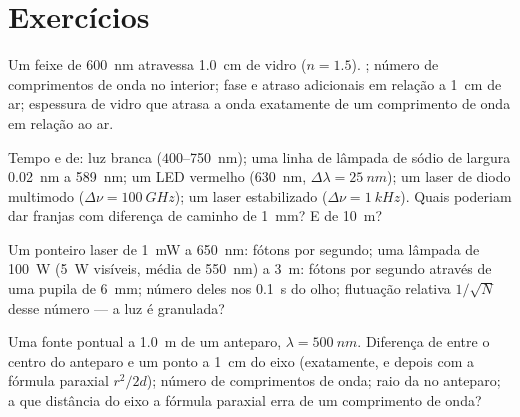 \section{Exercícios}

\begin{exercise}[$\star$]\label{exo:b2:scalar-light-model:1}
Um feixe de \qty{600}{nm} atravessa \qty{1.0}{cm} de vidro ($n = 1.5$). ; número de comprimentos de onda no interior; fase e atraso adicionais
em relação a \qty{1}{cm} de ar; espessura de vidro que atrasa a
onda exatamente de um comprimento de onda em relação ao ar.
\end{exercise}

\begin{exercise}[$\star$]\label{exo:b2:scalar-light-model:2}
Tempo e  de: luz branca ($400$--\qty{750}{nm}); uma linha
de lâmpada de sódio de largura \qty{0.02}{nm} a \qty{589}{nm}; um LED vermelho (\qty{630}{nm},
$\Delta\lambda = \qty{25}{nm}$); um laser de diodo multimodo ($\Delta\nu = \qty{100}{GHz}$); um
laser estabilizado ($\Delta\nu = \qty{1}{kHz}$). Quais poderiam dar franjas com
diferença de caminho de \qty{1}{mm}? E de \qty{10}{m}?
\end{exercise}

\begin{exercise}[$\star$]\label{exo:b2:scalar-light-model:3}
Um ponteiro laser de \qty{1}{mW} a \qty{650}{nm}: fótons por segundo; uma
lâmpada de \qty{100}{W} (\qty{5}{W} visíveis, média de \qty{550}{nm}) a \qty{3}{m}: fótons por
segundo através de uma pupila de \qty{6}{mm}; número deles nos \qty{0.1}{s} do olho;
flutuação relativa $1/\sqrt N$ desse número --- a luz é granulada?
\end{exercise}

\begin{exercise}[$\star$]\label{exo:b2:scalar-light-model:4}
Uma fonte pontual a \qty{1.0}{m} de um anteparo, $\lambda = \qty{500}{nm}$. Diferença de
 entre o centro do anteparo e um ponto a \qty{1}{cm}
do eixo (exatamente, e depois com a fórmula paraxial $r^2/2d$); número de
comprimentos de onda; raio da  no anteparo; a que
distância do eixo a fórmula paraxial erra de um comprimento de onda?
\end{exercise}

